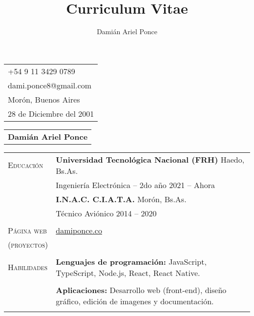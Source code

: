 \documentclass[12pt]{article}
\title{Curriculum Vitae}
\author{Damián Ariel Ponce}
\begin{document}
   \noindent
   \begin{tabular}[t]{@{}l} 
     +54 9 11 3429 0789\\
   dami.ponce8@gmail.com\\
   Morón, Buenos Aires\\
   28 de Diciembre del 2001
   \end{tabular}
   \hfill%
   \begin{tabular}[t]{l@{}} 
      \multirow{4}{*}{\textbf{\huge Damián Ariel Ponce}}
   \end{tabular}
   
   \noindent\hrulefill

   \vspace{0.5\baselineskip}\noindent
   \renewcommand{\arraystretch}{1}%
   \begin{tabular}[t]{@{}p{1.15in} @{}p{5.35in}}
   
   {\scshape Educación}
   &
   \textbf{Universidad Tecnológica Nacional (FRH)}  \hfill Haedo, Bs.As.\vspace{0.015in} \\ &
   Ingeniería Electrónica -- 2do año \hfill 2021 -- Ahora\vspace{0.015in}
   \vspace{0.5\baselineskip}
   \\
   & \textbf{I.N.A.C. C.I.A.T.A.}  \hfill Morón, Bs.As.\vspace{0.015in} \\ &
   Técnico Aviónico \hfill 2014 -- 2020\vspace{0.015in}
   \\
   \vspace{1\baselineskip}
   \\
      
   

   {\scshape Página web}
   &
   \href{https://damiponce.co}{damiponce.co}
   \\
   {\scshape (proyectos)}
   &
   \\
   \vspace{1\baselineskip}
   \\

   {\scshape Habilidades}
   &
   \textbf{Lenguajes de programación: }  JavaScript, TypeScript, Node.js, React, React Native.%
   \\
   \vspace{0.5\baselineskip}
   \\
   &
   \textbf{Aplicaciones: }  Desarrollo web (front-end), diseño gráfico, edición de imagenes y documentación.%
   \\
   \vspace{0.5\baselineskip}
   \\


\end{tabular}
\end{document}
